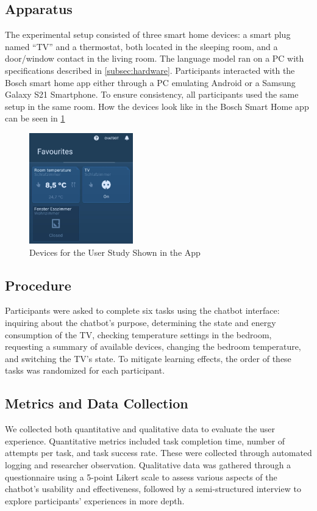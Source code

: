 \subsection{Apparatus}
The experimental setup consisted of three smart home devices: a smart plug named ``TV'' and a thermostat, both located in the sleeping room, and a door/window contact in the living room. The language model ran on a PC with specifications described in \cref{subsec:hardware}. Participants interacted with the Bosch smart home app either through a PC emulating Android or a Samsung Galaxy S21 Smartphone. To ensure consistency, all participants used the same setup in the same room.
How the devices look like in the Bosch Smart Home app can be seen in \cref{fig:devicesstudy}
\begin{figure}[h]
    \centering
    \captionsetup{justification=centering}
    \includegraphics[width=0.4\textwidth]{graphics/devices.jpeg}
    \caption{Devices for the User Study Shown in the App}
    \label{fig:devicesstudy}
\end{figure}

\subsection{Procedure}
Participants were asked to complete six tasks using the chatbot interface: inquiring about the chatbot's purpose, determining the state and energy consumption of the TV, checking temperature settings in the bedroom, requesting a summary of available devices, changing the bedroom temperature, and switching the TV's state. To mitigate learning effects, the order of these tasks was randomized for each participant.

\subsection{Metrics and Data Collection}
We collected both quantitative and qualitative data to evaluate the user experience. Quantitative metrics included task completion time, number of attempts per task, and task success rate. These were collected through automated logging and researcher observation. Qualitative data was gathered through a questionnaire using a 5-point Likert scale to assess various aspects of the chatbot's usability and effectiveness, followed by a semi-structured interview to explore participants' experiences in more depth.

